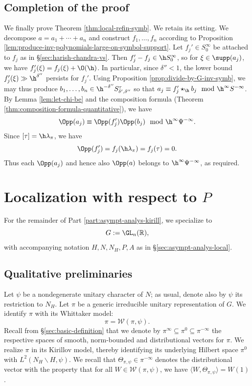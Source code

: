 \subsection{Completion of the proof}\label{sec:completion-proof}
We finally prove Theorem \ref{thm:local-refin-symb}.  We retain its setting.  We decompose $a = a_1 + \dotsb + a_n$ and construct $f_1,\dotsc,f_n$ according to Proposition \ref{lem:produce-inv-polynomials-large-on-symbol-support}.  Let $f_j'\in S^\infty_0$ be attached to $f_j$ as in \S\ref{sec:harish-chandra-vs}.  Then $f_j' - f_j \in \h S^\infty_0$, so for $\xi \in \supp(a_j)$, we have $f_j'(\xi) = f_j(\xi) + \O(\h)$.  In particular, since $\delta '' < 1$, the lower bound $f_j'(\xi) \gg \h^{\delta ''}$ persists for $f_j'$.  Using Proposition \ref{prop:divide-by-G-inv-symb}, we may thus produce $b_1,\dotsc,b_n \in \h^{- \delta ''} S^\tau_{\delta ', \delta ''}$ so that $a_j \equiv f_j' \star_{\h} b_j \mod{\h^\infty S^{-\infty}}$.  By Lemma \ref{lem:let-chi-be} and the composition formula (Theorem \ref{thm:composition-formula-quantitative}), we have
\[
  \Opp(a_j) \equiv \Opp(f_j') \Opp(b_j) \mod{\h^\infty \Psi^{-\infty}}.
\]
Since $[\tau] = \h \lambda_\pi$, we have
\[
  \Opp(f_j') = f_j(\h \lambda_\pi) = f_j(\tau) = 0.
\]
Thus each $\Opp(a_j)$ and hence also $\Opp(a)$ belongs to $\h^\infty \Psi^{-\infty}$, as required.






\section{Localization with respect to $P$}\label{sec:cuhn9f8y8q}
For the remainder of Part \ref{part:asympt-analys-kirill}, we specialize to
\begin{equation*}
  G := \GL_n(\mathbb{R}),
\end{equation*}
with accompanying notation $H, N, N_H, P, A$ as in \S\ref{sec:asympt-analys-local}.

\subsection{Qualitative preliminaries}\label{sec:qual-prel}

Let $\psi$ be a nondegenerate unitary character of $N$; as usual, denote also by $\psi$ its restriction to $N_H$.  Let $\pi$ be a generic irreducible unitary representation of $G$.  We identify $\pi$ with its Whittaker model:
\begin{equation*}
  \pi = \mathcal{W}(\pi,\psi).
\end{equation*}
Recall from \S\ref{sec:basic-definition} that we denote by $\pi^\infty \subseteq \pi^0 \subseteq \pi^{-\infty}$ the respective spaces of smooth, norm-bounded and distributional vectors for $\pi$.  We realize $\pi$ in its Kirillov model, thereby identifying its underlying Hilbert space $\pi^0$ with $L^2(N_H \backslash H, \psi)$.  We recall that $\Theta_{\pi,\psi} \in \pi^{-\infty}$ denotes the distributional vector with the property that for all $W \in \mathcal{W}(\pi,\psi)$, we have $\langle W, \Theta_{\pi,\psi} \rangle = W(1)$.

